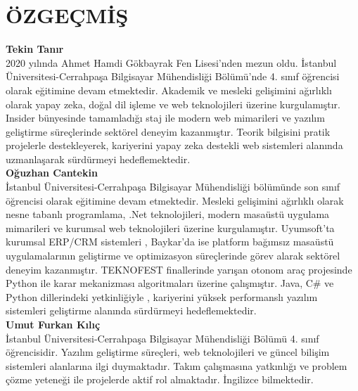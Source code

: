 \documentclass[12pt,a4paper]{report}
\begin{document}
\chapter*{ÖZGEÇMİŞ}

\noindent\textbf{Tekin Tanır}\\
2020 yılında Ahmet Hamdi Gökbayrak Fen Lisesi’nden mezun oldu. İstanbul Üniversitesi-Cerrahpaşa Bilgisayar Mühendisliği Bölümü’nde 4. sınıf öğrencisi olarak eğitimine devam etmektedir. Akademik ve mesleki gelişimini ağırlıklı olarak yapay zeka, doğal dil işleme ve web teknolojileri üzerine kurgulamıştır. Insider bünyesinde tamamladığı staj ile modern web mimarileri ve yazılım geliştirme süreçlerinde sektörel deneyim kazanmıştır. Teorik bilgisini pratik projelerle destekleyerek, kariyerini yapay zeka destekli web sistemleri alanında uzmanlaşarak sürdürmeyi hedeflemektedir.\\[1cm]

\noindent\textbf{Oğuzhan Cantekin}\\
İstanbul Üniversitesi-Cerrahpaşa Bilgisayar Mühendisliği bölümünde son sınıf öğrencisi olarak eğitimine devam etmektedir. Mesleki gelişimini ağırlıklı olarak nesne tabanlı programlama, .Net teknolojileri, modern masaüstü uygulama mimarileri ve kurumsal web teknolojileri üzerine kurgulamıştır.
Uyumsoft'ta kurumsal ERP/CRM sistemleri , Baykar'da ise platform bağımsız masaüstü uygulamalarının geliştirme ve optimizasyon süreçlerinde görev alarak sektörel deneyim kazanmıştır. TEKNOFEST finallerinde yarışan otonom araç projesinde Python ile karar mekanizması algoritmaları üzerine çalışmıştır. Java, C\# ve Python dillerindeki yetkinliğiyle , kariyerini yüksek performanslı yazılım sistemleri geliştirme alanında sürdürmeyi hedeflemektedir.\\[1cm]

\noindent\textbf{Umut Furkan Kılıç}\\
İstanbul Üniversitesi-Cerrahpaşa Bilgisayar Mühendisliği Bölümü 4. sınıf öğrencisidir. Yazılım geliştirme süreçleri, web teknolojileri ve güncel bilişim sistemleri alanlarına ilgi duymaktadır. Takım çalışmasına yatkınlığı ve problem çözme yeteneği ile projelerde aktif rol almaktadır. İngilizce bilmektedir.
\end{document}
